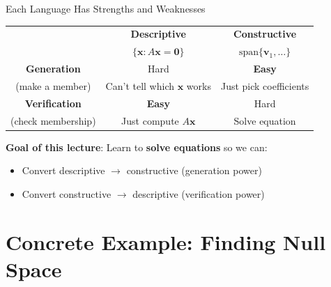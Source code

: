 \documentclass[10pt]{beamer}
\theoremstyle{definition}
\newcommand{\x}[1]{\alert{\textbf{#1}}}
\begin{document}
\begin{frame}{Each Language Has Strengths and Weaknesses}

\begin{center}
\begin{tabular}{|c|c|c|}
\hline
& \x{Descriptive} & \x{Constructive} \\
& $\{\mathbf{x} : A\mathbf{x} = \mathbf{0}\}$ & $\text{span}\{\mathbf{v}_1, \ldots\}$ \\
\hline
\textbf{Generation} & Hard & \x{Easy} \\
(make a member) & Can't tell which $\mathbf{x}$ works & Just pick coefficients \\
\hline
\textbf{Verification} & \x{Easy} & Hard \\
(check membership) & Just compute $A\mathbf{x}$ & Solve equation \\
\hline
\end{tabular}
\end{center}

\vspace{1em}

\x{Goal of this lecture}: Learn to \textbf{solve equations} so we can:
\begin{itemize}
\item Convert descriptive $\to$ constructive (generation power)
\item Convert constructive $\to$ descriptive (verification power)
\end{itemize}

\end{frame}

\section{Concrete Example: Finding Null Space}
\end{document}
